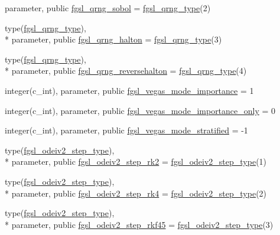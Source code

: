 \begin{DoxyCompactItemize}
parameter, public \hyperlink{classfgsl_ae1c1dcc2273c7307b2f972c9f04ab69f}{fgsl\-\_\-qrng\-\_\-sobol} = \hyperlink{structfgsl_1_1fgsl__qrng__type}{fgsl\-\_\-qrng\-\_\-type}(2)
\item 
type(\hyperlink{structfgsl_1_1fgsl__qrng__type}{fgsl\-\_\-qrng\-\_\-type}), \\*
parameter, public \hyperlink{classfgsl_a0d865a8d73c002f671f6e1bc1727966c}{fgsl\-\_\-qrng\-\_\-halton} = \hyperlink{structfgsl_1_1fgsl__qrng__type}{fgsl\-\_\-qrng\-\_\-type}(3)
\item 
type(\hyperlink{structfgsl_1_1fgsl__qrng__type}{fgsl\-\_\-qrng\-\_\-type}), \\*
parameter, public \hyperlink{classfgsl_a871225c291532b659185f193d97a976a}{fgsl\-\_\-qrng\-\_\-reversehalton} = \hyperlink{structfgsl_1_1fgsl__qrng__type}{fgsl\-\_\-qrng\-\_\-type}(4)
\item 
integer(c\-\_\-int), parameter, public \hyperlink{classfgsl_a40718f473b729ccccca99b83b15569f1}{fgsl\-\_\-vegas\-\_\-mode\-\_\-importance} = 1
\item 
integer(c\-\_\-int), parameter, public \hyperlink{classfgsl_a8b3b603c4ff1fa9726169eaeb1617cf4}{fgsl\-\_\-vegas\-\_\-mode\-\_\-importance\-\_\-only} = 0
\item 
integer(c\-\_\-int), parameter, public \hyperlink{classfgsl_a03809231ad730f80ecda79c11940298e}{fgsl\-\_\-vegas\-\_\-mode\-\_\-stratified} = -\/1
\item 
type(\hyperlink{structfgsl_1_1fgsl__odeiv2__step__type}{fgsl\-\_\-odeiv2\-\_\-step\-\_\-type}), \\*
parameter, public \hyperlink{classfgsl_a3f76db1b3a7cdaa6b00e64515d6641b0}{fgsl\-\_\-odeiv2\-\_\-step\-\_\-rk2} = \hyperlink{structfgsl_1_1fgsl__odeiv2__step__type}{fgsl\-\_\-odeiv2\-\_\-step\-\_\-type}(1)
\item 
type(\hyperlink{structfgsl_1_1fgsl__odeiv2__step__type}{fgsl\-\_\-odeiv2\-\_\-step\-\_\-type}), \\*
parameter, public \hyperlink{classfgsl_a3d8617454e04b4450cc8c8f3101ff504}{fgsl\-\_\-odeiv2\-\_\-step\-\_\-rk4} = \hyperlink{structfgsl_1_1fgsl__odeiv2__step__type}{fgsl\-\_\-odeiv2\-\_\-step\-\_\-type}(2)
\item 
type(\hyperlink{structfgsl_1_1fgsl__odeiv2__step__type}{fgsl\-\_\-odeiv2\-\_\-step\-\_\-type}), \\*
parameter, public \hyperlink{classfgsl_a9ddf77505b3bd58dea1832c7d57cb566}{fgsl\-\_\-odeiv2\-\_\-step\-\_\-rkf45} = \hyperlink{structfgsl_1_1fgsl__odeiv2__step__type}{fgsl\-\_\-odeiv2\-\_\-step\-\_\-type}(3)

\end{DoxyCompactItemize}
